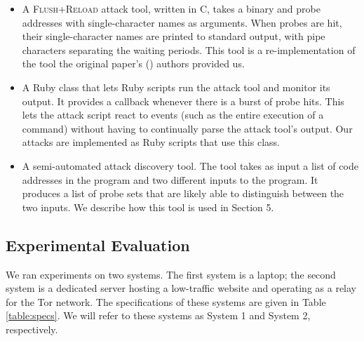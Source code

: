 \documentclass[letterpaper,twocolumn,10pt]{article}
\begin{document}
\begin{itemize}
    \item A \textsc{Flush+Reload} attack tool, written in C, takes a binary and probe
        addresses with single-character names as arguments. When probes are hit,
        their single-character names are printed to standard output, with pipe
        characters separating the waiting periods. This tool is
        a re-implementation of the tool the original paper's
        (\cite{yarom2013flush}) authors provided us.

    \item A Ruby class that lets Ruby scripts run the attack tool and monitor
        its output. It provides a callback whenever there is a burst of probe
        hits. This lets the attack script react to events (such as the entire
        execution of a command) without having to continually parse the attack
        tool's output. Our attacks are implemented as Ruby scripts that use this
        class.

    \item A semi-automated attack discovery tool. The tool takes as input a list
        of code addresses in the program and two different inputs to the
        program. It produces a list of probe sets that are likely able to
        distinguish between the two inputs. We describe how this tool is used in
        Section 5.
\end{itemize}

\subsection{Experimental Evaluation}

We ran experiments on two systems. The first system is a laptop; the second
system is a dedicated server hosting a low-traffic website and operating as
a relay for the Tor network. The specifications of these systems are given in
Table \ref{table:specs}. We will refer to these systems as System 1 and System
2, respectively.
\end{document}
